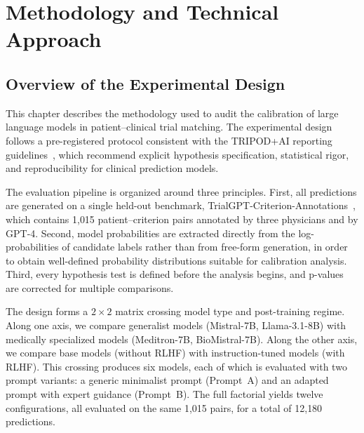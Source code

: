 
\chapter{Methodology and Technical Approach}
\label{chap:methodology}

\section{Overview of the Experimental Design}
\label{sec:met-overview}

This chapter describes the methodology used to audit the calibration of large 
language models in patient--clinical trial matching. The experimental design 
follows a pre-registered protocol consistent with the TRIPOD+AI reporting 
guidelines~\cite{collins2024tripod}, which recommend explicit hypothesis 
specification, statistical rigor, and reproducibility for clinical prediction 
models.

The evaluation pipeline is organized around three principles. First, all 
predictions are generated on a single held-out benchmark, 
TrialGPT-Criterion-Annotations~\cite{jin2024trialgpt}, which contains 1{,}015 
patient--criterion pairs annotated by three physicians and by GPT-4. Second, 
model probabilities are extracted directly from the log-probabilities of 
candidate labels rather than from free-form generation, in order to obtain 
well-defined probability distributions suitable for calibration analysis. 
Third, every hypothesis test is defined before the analysis begins, and 
p-values are corrected for multiple comparisons.

The design forms a $2 \times 2$ matrix crossing model type and post-training 
regime. Along one axis, we compare generalist models (Mistral-7B, 
Llama-3.1-8B) with medically specialized models (Meditron-7B, BioMistral-7B). 
Along the other axis, we compare base models (without RLHF) with 
instruction-tuned models (with RLHF). This crossing produces six models, each 
of which is evaluated with two prompt variants: a generic minimalist prompt 
(Prompt~A) and an adapted prompt with expert guidance (Prompt~B). The full 
factorial yields twelve configurations, all evaluated on the same 1{,}015 
pairs, for a total of 12{,}180 predictions.

